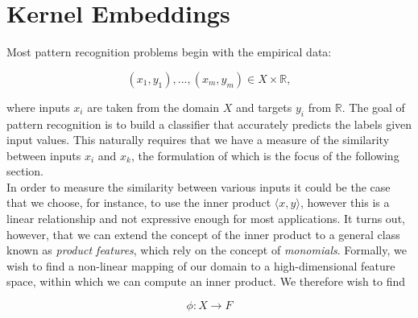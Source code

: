 \section{Kernel Embeddings}




Most pattern recognition problems begin with the empirical data:

\begin{equation}
(x_1, y_1), ..., (x_m, y_m) \in X \times \mathbb{R},
\end{equation} 

\noindent where inputs $x_i$ are taken from the domain $X$ and targets $y_i$ from $\mathbb{R}$. The goal of pattern recognition is to build a classifier that accurately predicts the labels given input values. This naturally requires that we have a measure of the similarity between inputs $x_i$ and $x_k$, the formulation of which is the focus of the following section. \\

In order to measure the similarity between various inputs it could be the case that we choose, for instance, to use the inner product $\langle x, y \rangle$, however this is a linear relationship and not expressive enough for most applications. It turns out, however, that we can extend the concept of the inner product to a general class known as \textit{product features}, which rely on the concept of \textit{monomials}. Formally, we wish to find a non-linear mapping of our domain to a high-dimensional feature space, within which we can compute an inner product. We therefore wish to find

\begin{equation}
\phi \colon X \rightarrow F 
\end{equation} 

